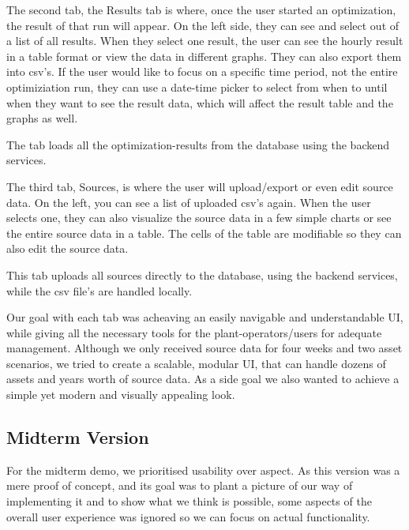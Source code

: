 \hspace*{1cm}The second tab, the Results tab is where, once the user started an optimization, the result of that run will appear. On the left side, they can see and select out of a list of all results. When they select one result, the user can see the hourly result in a table format or view the data in different graphs. They can also export them into csv's. If the user would like to focus on a specific time period, not the entire optimiziation run, they can use a date-time picker to select from when to until when they want to see the result data, which will affect the result table and the graphs as well.
	
\hspace*{1cm}The tab loads all the optimization-results from the database using the backend services.
	
\hspace*{1cm}The third tab, Sources, is where the user will upload/export or even edit source data. On the left, you can see a list of uploaded csv's again. When the user selects one, they can also visualize the source data in a few simple charts or see the entire source data in a table. The cells of the table are modifiable so they can also edit the source data.
	
\hspace*{1cm}This tab uploads all sources directly to the database, using the backend services, while the csv file's are handled locally.
	
\hspace*{1cm}Our goal with each tab was acheaving an easily navigable and understandable UI, while giving all the necessary tools for the plant-operators/users for adequate management. Although we only received source data for four weeks and two asset scenarios, we tried to create a scalable, modular UI, that can handle dozens of assets and years worth of source data. As a side goal we also wanted to achieve a simple yet modern and visually appealing look.

\subsection{Midterm Version}

\hspace*{1cm}For the midterm demo, we prioritised usability over aspect. As this version was a mere proof of concept, and its goal was to plant a picture of our way of implementing it and to show what we think is possible, some aspects of the overall user experience was ignored so we can focus on actual functionality.

